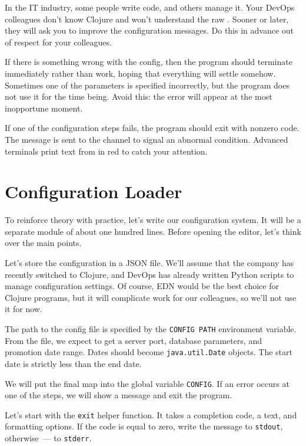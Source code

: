 
In the IT industry, some people write code, and others manage it. Your DevOps colleagues don't know Clojure and won't understand the raw . Sooner or later, they will ask you to improve the configuration messages. Do this in advance out of respect for your colleagues.

If there is something wrong with the config, then the program should terminate immediately rather than work, hoping that everything will settle somehow. Sometimes one of the parameters is specified incorrectly, but the program does not use it for the time being. Avoid this: the error will appear at the most inopportune moment.


If one of the configuration steps fails, the program should exit with nonzero code. The message is sent to the  channel to signal an abnormal condition. Advanced terminals print text from  in red to catch your attention.

\section{Configuration Loader}


To reinforce theory with practice, let's write our configuration system. It will be a separate module of about one hundred lines. Before opening the editor, let's think over the main points.

Let's store the configuration in a JSON file. We'll assume that the company has recently switched to Clojure, and DevOps has already written Python scripts to manage configuration settings. Of course, EDN would be the best choice for Clojure programs, but it will complicate work for our colleagues, so we'll not use it for now.


The path to the config file is specified by the \verb|CONFIG PATH| environment variable. From the file, we expect to get a server port, database parameters, and promotion date range. Dates should become \verb|java.util.Date| objects. The start date is strictly less than the end date.

We will put the final map into the global variable \verb|CONFIG|. If an error occurs at one of the steps, we will show a message and exit the program.

Let's start with the \verb|exit| helper function. It takes a completion code, a text, and formatting options. If the code is equal to zero, write the message to \verb|stdout|, otherwise~--- to \verb|stderr|.


